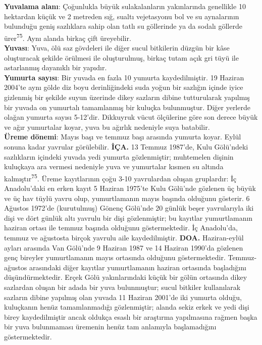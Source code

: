 \documentclass[
  letterpaper,
  DIV=11,
  numbers=noendperiod]{scrreprt}
\begin{document}
\textbf{Yuvalama alanı}: Çoğunlukla büyük sulakalanların yakınlarında
genellikle 10 hektardan küçük ve 2 metreden sığ, sualtı vejetasyonu bol
ve su aynalarının bulunduğu geniş sazlıklara sahip olan tatlı su
göllerinde ya da sodalı göllerde ürer\textsuperscript{75}. Aynı alanda
birkaç çift üreyebilir.\\
\textbf{Yuvası}: Yuva, ölü saz gövdeleri ile diğer sucul bitkilerin
düzgün bir kâse oluşturacak şekilde örülmesi ile oluşturulmuş, birkaç
tutam açık gri tüyü ile astarlanmış dayanıklı bir yapıdır.\\
\textbf{Yumurta sayısı}: Bir yuvada en fazla 10 yumurta kaydedilmiştir.
19 Haziran 2004'te aynı gölde diz boyu derinliğindeki suda yoğun bir
sazlığın içinde iyice gizlenmiş bir şekilde suyun üzerinde dikey
sazların dibine tutturularak yapılmış bir yuvada on yumurtalı
tamamlanmış bir kuluçka bulunmuştur. Diğer yerlerde olağan yumurta
sayısı 5-12'dir. Dikkuyruk vücut ölçülerine göre son derece büyük ve
ağır yumurtalar koyar, yuva bu ağırlık nedeniyle suya batabilir.\\
\textbf{Üreme dönemi}: Mayıs başı ve temmuz başı arasında yumurta koyar.
Eylül sonuna kadar yavrular görülebilir. \textbf{İÇA.} 13 Temmuz
1987'de, Kulu Gölü'ndeki sazlıkların içindeki yuvada yedi yumurta
gözlenmiştir; muhtemelen dişinin kuluçkaya ara vermesi nedeniyle yuva ve
yumurtalar kısmen su altında kalmıştır\textsuperscript{75}. Üreme
kayıtlarının çoğu 3-10 yavrulardan oluşan gruplardır: İç Anadolu'daki en
erken kayıt 5 Haziran 1975'te Kulu Gölü'nde gözlenen üç büyük ve üç hav
tüylü yavru olup, yumurtlamanın mayıs başında olduğunu gösterir. 6
Ağustos 1972'de (kurutulmuş) Gönenç Gölü'nde 20 günlük beşer
yavrularıyla iki dişi ve dört günlük altı yavrulu bir dişi gözlenmiştir;
bu kayıtlar yumurtlamanın haziran ortası ile temmuz başında olduğunu
göstermektedir. İç Anadolu'da, temmuz ve ağustosta birçok yavrulu aile
kaydedilmiştir. \textbf{DOA.} Haziran-eylül ayları arasında Van Gölü'nde
9 Haziran 1987 ve 14 Haziran 1990'da gözlenen genç bireyler
yumurtlamanın mayıs ortasında olduğunu göstermektedir. Temmuz-ağustos
arasındaki diğer kayıtlar yumurtlamanın haziran ortasında başladığını
düşündürmektedir. Erçek Gölü yakınlarındaki küçük bir gölün ortasında
dikey sazlardan oluşan bir adada bir yuva bulunmuştur; sucul bitkiler
kullanılarak sazların dibine yapılmış olan yuvada 11 Haziran 2001'de iki
yumurta olduğu, kuluçkanın henüz tamamlanmadığı gözlenmiştir; alanda
sekiz erkek ve yedi dişi birey kaydedilmiştir ancak oldukça esaslı bir
araştırma yapılmasına rağmen başka bir yuva bulunmaması üremenin henüz
tam anlamıyla başlamadığını göstermektedir.
\end{document}
